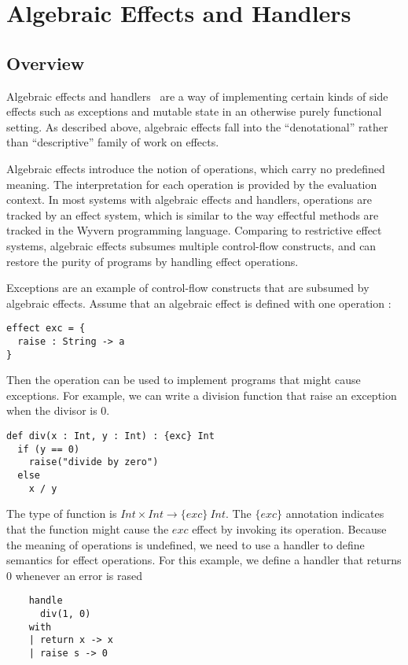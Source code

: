 \section{Algebraic Effects and Handlers}

\subsection{Overview}
  Algebraic effects and handlers~\cite{plotkin03,plotkin09} are a way of implementing certain kinds of side effects such as exceptions and mutable state in an otherwise purely functional setting.  As described above, algebraic effects fall into the ``denotational'' rather than ``descriptive'' family of work on effects. 
  
Algebraic effects introduce the notion of operations, which carry no predefined meaning. The interpretation for each operation is provided by the evaluation context. In most systems with algebraic effects and handlers, operations are tracked by an effect system, which is similar to the way effectful methods are tracked in the Wyvern programming language. Comparing to restrictive effect systems, algebraic effects subsumes multiple control-flow constructs, and can restore the purity of programs by handling effect operations.

Exceptions are an example of control-flow constructs that are subsumed by algebraic effects. Assume that an algebraic effect  is defined with one operation :
\begin{verbatim}
effect exc = {
  raise : String -> a
}
\end{verbatim}
Then the operation  can be used to implement programs that might cause exceptions. For example, we can write a division function that raise an exception when the divisor is 0.
\begin{verbatim}
def div(x : Int, y : Int) : {exc} Int
  if (y == 0)
    raise("divide by zero")
  else
    x / y
\end{verbatim}

The type of function  is $Int \times Int \rightarrow \{exc\}\ Int$. The $\{exc\}$ annotation indicates that the function might cause the $exc$ effect by invoking its operation. Because the meaning of operations is undefined, we need to use a handler to define semantics for effect operations. For this example, we define a handler that returns 0 whenever an error is rased

\begin{verbatim}
	handle 
	  div(1, 0)
	with 
	| return x -> x
	| raise s -> 0
\end{verbatim}

